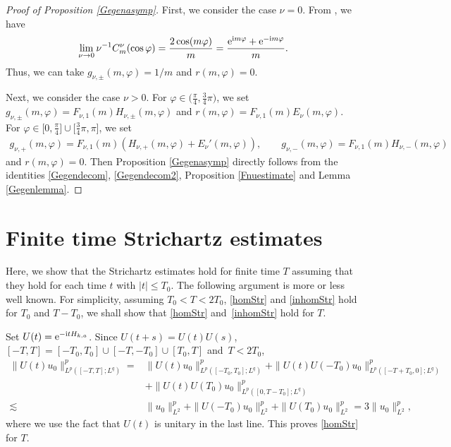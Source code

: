 \documentclass[pdftex]{sigma}
\numberwithin{equation}{section}
\def\f{\varphi}
\def\n{\nu}
\begin{document}
\begin{proof}[Proof of Proposition \ref{Gegenasymp}]
First, we consider the case $\n=0$. From \cite[equation~(4.28)]{BKO}, we have
\begin{align*}
\lim_{\n\to 0}\n^{-1}C_m^{\n}(\cos\f)=\frac{2\cos (m\f)}{m}=\frac{{\rm e}^{{\rm i}m\f}+{\rm e}^{-{\rm i}m\f}}{m}.
\end{align*}
Thus, we can take $g_{\n,\pm}(m,\f)=1/m$ and $r(m,\f)=0$.

Next, we consider the case $\n>0$. For $\f\in \bigl(\frac{\pi}{4}, \frac{3}{4}\pi\bigr)$, we set $g_{\n,\pm}(m,\f)=F_{\n,1}(m)H_{\n,\pm}(m,\f)$ and $r(m,\f)=F_{\n,1}(m)E_{\n}(m,\f)$. For $\f\in \bigl[0,\frac{\pi}{4}\bigr]\cup \bigl[\frac{3}{4}\pi,\pi\bigr]$, we set
\begin{align*}
g_{\n,+}(m,\f)=F_{\n,1}(m)(H_{\n,+}(m,\f)+E_{\n}'(m,\f)),\qquad g_{\n,-}(m,\f)=F_{\n,1}(m)H_{\n,-}(m,\f)
\end{align*}
and $r(m,\f)=0$. Then Proposition \ref{Gegenasymp} directly follows from the identities \eqref{Gegendecom}, \eqref{Gegendecom2}, Proposition \ref{Fnuestimate} and Lemma \ref{Gegenlemma}.
\end{proof}

\section{Finite time Strichartz estimates}\label{finitetime}

Here, we show that the Strichartz estimates hold for finite time $T$ assuming that they hold for each time $t$ with $|t|\leq T_0$.
The following argument is more or less well known.
For simplicity, assuming $T_0<T<2T_0$, \eqref{homStr} and \eqref{inhomStr} hold for $T_0$ and $T-T_0$, we shall show that \eqref{homStr} and~\eqref{inhomStr} hold for $T$.

Set $U(t)={\rm e}^{-{\rm i}tH_{k,a}}$.
Since $U(t+s)=U(t)U(s)$, $[-T,T]=[-T_0,T_0]\cup [-T,-T_0]\cup [T_0,T]$ and~${T<2T_0}$,
\begin{align*}
\|U(t)u_0\|_{L^p([-T,T];L^q)}^p={}&\|U(t)u_0\|_{L^p([-T_0,T_0];L^q)}^p+\|U(t)U(-T_0)u_0\|_{L^p([-T+T_0,0];L^q)}^p\\
&+\|U(t)U(T_0)u_0\|_{L^p([0,T-T_0];L^q)}^p\\
\lesssim{}&\|u_0\|_{L^2}^p+\|U(-T_0)u_0\|_{L^2}^p+\|U(T_0)u_0\|_{L^2}^p=3\|u_0\|_{L^2}^p,
\end{align*}
where we use the fact that $U(t)$ is unitary in the last line. This proves \eqref{homStr} for $T$.
\end{document}
